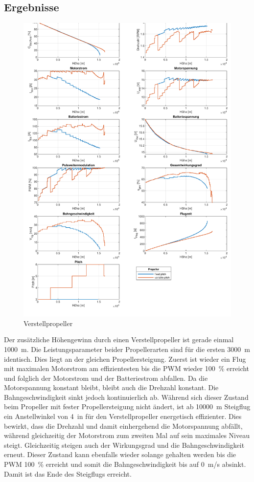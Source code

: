 \subsection{Ergebnisse}
\begin{figure}[H]
	\includegraphics[scale=0.7]{Diagramme/Verstellpropeller.pdf}
	\caption{Verstellpropeller}
	\label{abb:verstellpropeller}
\end{figure}
Der zusätzliche Höhengewinn durch einen Verstellpropeller ist gerade einmal \SI{1000}{m}. Die Leistungsparameter beider Propellerarten sind für die ersten \SI{3000}{m} identisch. Dies liegt an der gleichen Propellersteigung. Zuerst ist wieder ein Flug mit maximalen Motorstrom am effizientesten bis die PWM wieder \SI{100}{\%} erreicht und folglich der Motorstrom und der Batteriestrom abfallen. Da die Motorspannung konstant bleibt, bleibt auch die Drehzahl konstant. Die Bahngeschwindigkeit sinkt jedoch kontinuierlich ab. Während sich dieser Zustand beim Propeller mit fester Propellersteigung nicht ändert, ist ab \SI{10000}{m} Steigflug ein Anstellwinkel von \SI{4}{in} für den Verstellpropeller energetisch effizienter. Dies bewirkt, dass die Drehzahl und damit einhergehend die Motorspannung abfällt, während gleichzeitig der Motorstrom zum zweiten Mal auf sein maximales Niveau steigt. Gleichzeitig steigen auch der Wirkungsgrad und die Bahngeschwindigkeit erneut. Dieser Zustand kann ebenfalls wieder solange gehalten werden bis die PWM \SI{100}{\%} erreicht und somit die Bahngeschwindigkeit bis auf \SI{0}{m/s} absinkt. Damit ist das Ende des Steigflugs erreicht. \\
